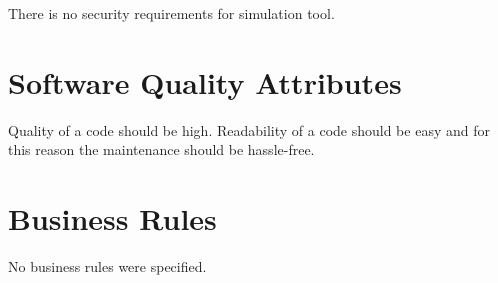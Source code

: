 	There is no security requirements for simulation tool.
\section{Software Quality Attributes}
\begin{comment}
	$<$Specify any additional quality characteristics for the product that will be 
	important to either the customers or the developers. Some to consider are: 
	adaptability, availability, correctness, flexibility, interoperability, 
	maintainability, portability, reliability, reusability, robustness, testability, 
	and usability. Write these to be specific, quantitative, and verifiable when 
	possible. At the least, clarify the relative preferences for various attributes, 
	such as ease of use over ease of learning.$>$
\end{comment}
	{
		Quality of a code should be high. Readability of a code should be easy and for this reason the maintenance should be hassle-free.
	}
\section{Business Rules}
	\begin{comment}
		$<$List any operating principles about the product, such as which individuals or 
		roles can perform which functions under specific circumstances. These are not 
		functional requirements in themselves, but they may imply certain functional 
		requirements to enforce the rules.$>$
	\end{comment}
	No business rules were specified.